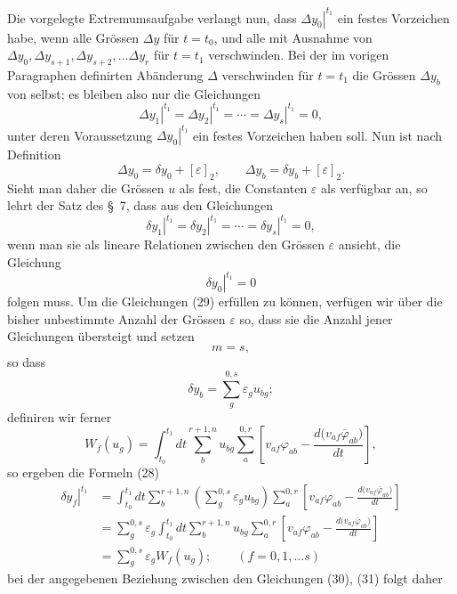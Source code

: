 \documentclass[11pt,a4paper,leqno]{article}
\begin{document}
Die vorgelegte Extremumsaufgabe verlangt nun, dass $\left.\Delta y_0\right|^{t_1}$ ein festes Vorzeichen habe, wenn alle Grössen $\Delta y$ für $t=t_0$, und alle mit Ausnahme von $\Delta y_0,\Delta y_{s+1},\Delta y_{s+2},\ldots\Delta y_r$ für $t=t_1$ verschwinden. Bei der im vorigen Paragraphen definirten Abänderung $\Delta$ verschwinden für $t=t_1$ die Grössen $\Delta y_b$ von selbst; es bleiben also nur die Gleichungen
\begin{equation}\tag{29}
\left.\Delta y_1\right|^{t_1}
=\left.\Delta y_2\right|^{t_1}
=\cdots
=\left.\Delta y_s\right|^{t_1}=0,
\end{equation}
unter deren Voraussetzung $\left.\Delta y_0\right|^{t_1}$ ein festes Vorzeichen haben soll. Nun ist nach Definition
\[
\Delta y_0=\delta y_0+[\varepsilon]_2,
\qquad
\Delta y_b=\delta y_b+[\varepsilon]_2.
\]
Sieht man daher die Grössen $u$ als fest, die Constanten $\varepsilon$ als verfügbar an, so lehrt der Satz des \S~7, dass aus den Gleichungen
\begin{equation}\tag{30}
\left.\delta y_1\right|^{t_1}
=\left.\delta y_2\right|^{t_1}
=\cdots
=\left.\delta y_s\right|^{t_1}=0,
\end{equation}
wenn man sie als lineare Relationen zwischen den Grössen $\varepsilon$ ansieht, die Gleichung
\begin{equation}\tag{31}
\left.\delta y_0\right|^{t_1}=0
\end{equation}
folgen muss. Um die Gleichungen (29) erfüllen zu können, verfügen wir über die bisher unbestimmte Anzahl der Grössen $\varepsilon$ so, dass sie die Anzahl jener Gleichungen übersteigt und setzen
\[
m=s,
\]
so dass
\[
\delta y_b=\sum_g^{0,s}\varepsilon_g u_{bg};
\]
definiren wir ferner
\[
W_f(u_g)=
\int_{t_0}^{t_1}dt\sum_b^{r+1,n}u_{bg}\sum_a^{0,r}
\left[
v_{af}\varphi_{ab}-\frac{d\bigl(v_{af}\overline{\varphi}_{ab}\bigr)}{dt}
\right],
\]
so ergeben die Formeln (28)
\begin{align*}
\left.\delta y_f\right|^{t_1}
&=
\int_{t_0}^{t_1}dt\sum_b^{r+1,n}
\left(\sum_g^{0,s}\varepsilon_gu_{bg}\right)
\sum_a^{0,r}
\left[
v_{af}\varphi_{ab}-\frac{d\bigl(v_{af}\overline{\varphi}_{ab}\bigr)}{dt}
\right]\\
&=
\sum_g^{0,s}\varepsilon_g
\int_{t_0}^{t_1}dt\sum_b^{r+1,n}u_{bg}\sum_a^{0,r}
\left[
v_{af}\varphi_{ab}-\frac{d\bigl(v_{af}\overline{\varphi}_{ab}\bigr)}{dt}
\right]\\
&=
\sum_g^{0,s}\varepsilon_gW_f(u_g);
\qquad(f=0,1,\ldots s)
\end{align*}
bei der angegebenen Beziehung zwischen den Gleichungen (30), (31) folgt daher
\end{document}
